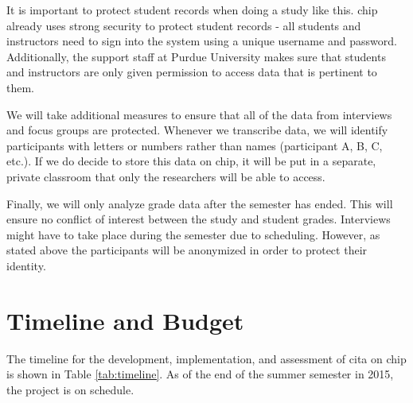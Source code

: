 It is important to protect student records when doing a study like this. \gls{chip} already uses strong security to protect student records - all students and instructors need to sign into the system using a unique username and password. Additionally, the support staff at Purdue University makes sure that students and instructors are only given permission to access data that is pertinent to them.

We will take additional measures to ensure that all of the data from interviews and focus groups are protected. Whenever we transcribe data, we will identify participants with letters or numbers rather than names (participant A, B, C, etc.). If we do decide to store this data on \gls{chip}, it will be put in a separate, private classroom that only the researchers will be able to access.

Finally, we will only analyze grade data after the semester has ended. This will ensure no conflict of interest between the study and student grades. Interviews might have to take place during the semester due to scheduling. However, as stated above the participants will be anonymized in order to protect their identity.

\section{Timeline and Budget}

The timeline for the development, implementation, and assessment of \gls{cita} on \gls{chip} is shown in Table \ref{tab:timeline}. As of the end of the summer semester in 2015, the project is on schedule.

\pagebreak

